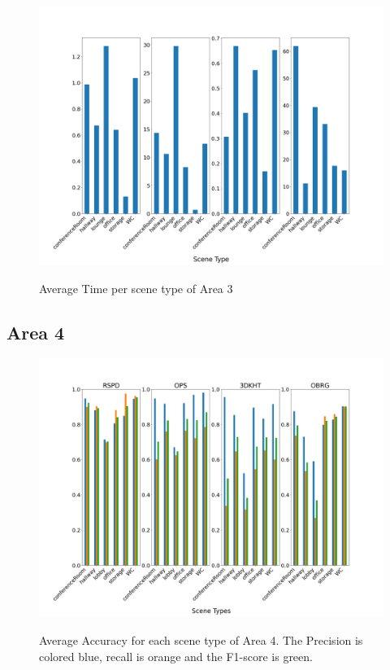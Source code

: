 \documentclass[main.tex]{subfiles}
\begin{document}
\begin{figure}[H]
    \centering
    \includegraphics[width=15 cm]{images/area_3_time.png}
    \label{fig:area3T}
    \caption[Times Area 3]{Average Time per scene type of Area 3}
\end{figure}


\subsection{Area 4}

\begin{figure}[H]
    \centering
    \includegraphics[width=15 cm]{images/area_4_acc.png}
    \label{fig:area4A}
    \caption[Accuracies Area 4]{Average Accuracy for each scene type of Area 4. The Precision
        is colored blue, recall is orange and the F1-score is green. }
\end{figure}
\end{document}
